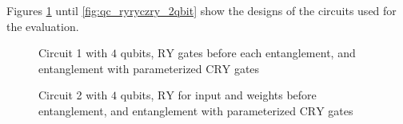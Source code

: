 Figures \ref{fig:qc_ryrycryry} until \ref{fig:qc_ryryczry_2qbit} show the designs of the circuits used for the evaluation.


\begin{figure}[!ht]
    \centering
    \caption{Circuit 1 with $4$ qubits, $\mathrm{RY}$ gates before each entanglement, and entanglement with parameterized $\mathrm{CRY}$ gates}
    \label{fig:qc_ryrycryry}
\end{figure}

\begin{figure}[!ht]
    \centering
    \caption{Circuit 2 with $4$ qubits, $\mathrm{RY}$ for input and weights before entanglement, and entanglement with parameterized $\mathrm{CRY}$ gates}
    \label{fig:qc_ryrycrycry}
\end{figure}

